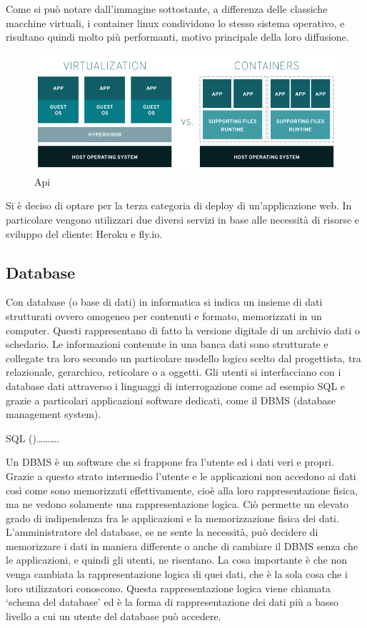 \documentclass[12pt,a4paper]{article}
\begin{document}
Come si può notare dall’immagine sottostante, a differenza delle classiche macchine virtuali, i container linux condividono lo stesso sistema operativo, e risultano quindi molto più performanti, motivo principale della loro diffusione.

\begin{figure}[H]
    \centering
    \includegraphics[width=.9\linewidth]{vm_docker.png}
    \caption{Api}
\end{figure}

Si è deciso di optare per la terza categoria di deploy di un’applicazione web. In particolare vengono utilizzari due diversi servizi in base alle necessità di risorse e sviluppo del cliente: Heroku e fly.io.


\subsection{Database}
Con database (o base di dati) in informatica si indica un insieme di dati strutturati ovvero omogeneo per contenuti e formato, memorizzati in un computer. Questi rappresentano di fatto la versione digitale di un archivio dati o schedario.
Le informazioni contenute in una banca dati sono strutturate e collegate tra loro secondo un particolare modello logico scelto dal progettista, tra relazionale, gerarchico, reticolare o a oggetti. Gli utenti si interfacciano con i database dati attraverso i linguaggi di interrogazione come ad esempio SQL e grazie a particolari applicazioni software dedicati, come il DBMS (database management system).

SQL ()……….

Un DBMS è un software che si frappone fra l’utente ed i dati veri e propri. Grazie a questo strato intermedio l’utente e le applicazioni non accedono ai dati così come sono memorizzati effettivamente, cioè alla loro rappresentazione fisica, ma ne vedono solamente una rappresentazione logica. Ciò permette un elevato grado di indipendenza fra le applicazioni e la memorizzazione fisica dei dati. L’amministratore del database, se ne sente la necessità, può decidere di memorizzare i dati in maniera differente o anche di cambiare il DBMS senza che le applicazioni, e quindi gli utenti, ne risentano. La cosa importante è che non venga cambiata la rappresentazione logica di quei dati, che è la sola cosa che i loro utilizzatori conoscono. Questa rappresentazione logica viene chiamata ‘schema del database’ ed è la forma di rappresentazione dei dati più a basso livello a cui un utente del database può accedere.
\end{document}
